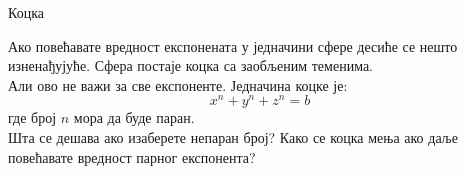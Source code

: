 ﻿\documentclass[en]{./../../common/SurferDesc}%
\begin{document}
\footnotesize
%

\begin{surferPage}
  \begin{surferTitle}Коцка\end{surferTitle}
   \begin{surferText}
   
Ако повећавате вредност експонената у једначини сфере десиће се нешто изненађујуће. Сфера постаје коцка са заобљеним теменима.\\
\vspace{0.3cm}
Али ово не важи за све експоненте. Једначина коцке је:
\[x^n+y^n+z^n=b\]
где број $n$ мора да буде паран.\\
\vspace{0.3cm}
Шта се дешава ако изаберете непаран број? Како се коцка мења ако даље повећавате вредност парног експонента?
     \end{surferText}
\end{surferPage}
\end{document}
